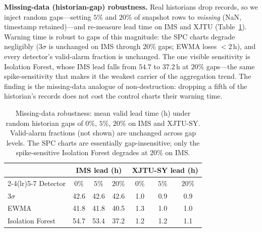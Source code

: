 \documentclass[journal]{IEEEtran}
\begin{document}
\textbf{Missing-data (historian-gap) robustness.} Real historians drop records, so we
inject random gaps---setting $5\%$ and $20\%$ of snapshot rows to \emph{missing}
(NaN, timestamp retained)---and re-measure lead time on IMS and XJTU
(Table~\ref{tab:gaps}). Warning time is robust to gaps of this magnitude: the SPC charts
degrade negligibly (3$\sigma$ is unchanged on IMS through $20\%$ gaps; EWMA loses
$<2$\,h), and every detector's valid-alarm fraction is unchanged. The one visible
sensitivity is Isolation Forest, whose IMS lead falls from $54.7$ to $37.2$\,h at $20\%$
gaps---the same spike-sensitivity that makes it the weakest carrier of the aggregation
trend. The finding is the missing-data analogue of non-destruction: dropping a fifth of
the historian's records does not cost the control charts their warning time.

\begin{table}[t]
\caption{Missing-data robustness: mean valid lead time (h) under random historian gaps
of $0\%$, $5\%$, $20\%$ on IMS and XJTU-SY. Valid-alarm fractions (not shown) are
unchanged across gap levels. The SPC charts are essentially gap-insensitive; only the
spike-sensitive Isolation Forest degrades at $20\%$ on IMS.}
\label{tab:gaps}
\centering
\footnotesize
\setlength{\tabcolsep}{5pt}
\begin{tabular}{@{}lccc|ccc@{}}
\toprule
& \multicolumn{3}{c}{IMS lead (h)} & \multicolumn{3}{c}{XJTU-SY lead (h)} \\
\cmidrule(lr){2-4}\cmidrule(lr){5-7}
Detector & $0\%$ & $5\%$ & $20\%$ & $0\%$ & $5\%$ & $20\%$ \\
\midrule
3$\sigma$        & 42.6 & 42.6 & 42.6 & 1.0 & 0.9 & 0.9 \\
EWMA             & 41.8 & 41.8 & 40.5 & 1.3 & 1.0 & 1.0 \\
Isolation Forest & 54.7 & 53.4 & 37.2 & 1.2 & 1.2 & 1.1 \\
\bottomrule
\end{tabular}
\end{table}
\end{document}
